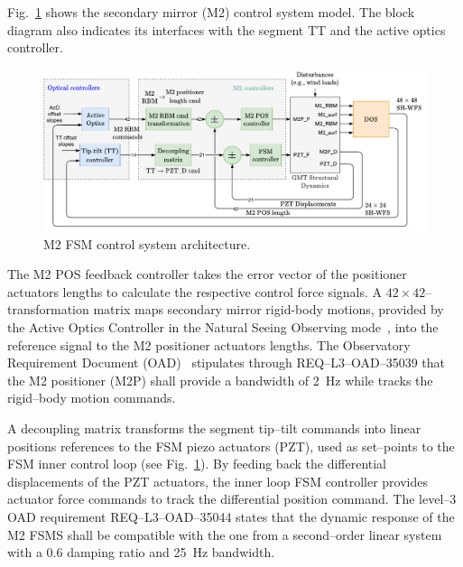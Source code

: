 \documentclass{gmto}
\begin{document}
Fig.~\ref{fig:fsm_control_arch} shows the secondary mirror (M2) control system model. The block diagram also indicates its interfaces with the segment TT and the active optics controller. %
%
\begin{figure}[!hbt]
    \vspace{6pt}
    \centering
    \includegraphics[width=\textwidth]{WFC-FSM_control_intf.pdf}
    \caption{M2 FSM control system architecture.}
    \label{fig:fsm_control_arch}
\end{figure}
%
The M2 POS feedback controller takes the error vector of the positioner actuators lengths to calculate the respective control force signals. A $42 \times 42$--transformation matrix maps secondary mirror rigid-body motions, provided by the Active Optics Controller in the Natural Seeing Observing mode~\cite{GMTO.NS.Alg.DOC}, into the reference signal to the M2 positioner actuators lengths. The Observatory Requirement Document (OAD)~\cite{OAD}  stipulates through REQ--L3--OAD--35039 that the M2 positioner (M2P) shall provide a bandwidth of \SI{2}{Hz} while tracks the rigid--body motion commands.

A decoupling matrix transforms the segment tip--tilt commands into linear positions references to the FSM piezo actuators (PZT), used as set--points to the FSM inner control loop (see Fig.~\ref{fig:fsm_control_arch}). By feeding back the differential displacements of the PZT actuators, the inner loop FSM controller provides actuator force commands to track the differential position command. %
The level--3 OAD requirement REQ--L3--OAD--35044 \cite{OAD} states that the dynamic response of the M2 FSMS shall be compatible with the one from a second--order linear system with a $0.6$ damping ratio and \SI{25}{Hz} bandwidth.
\end{document}
